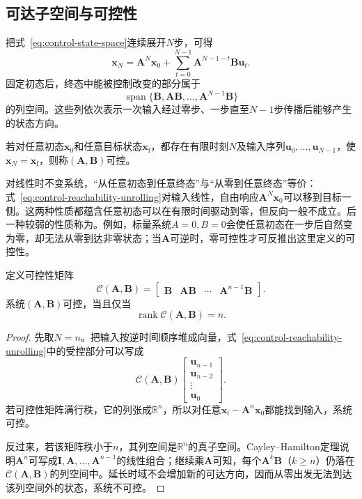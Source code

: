 \subsection{可达子空间与可控性}
把式~\eqref{eq:control-state-space}连续展开$N$步，可得
\begin{equation}
  \bm{x}_N
  =
  \bm{A}^{N}\bm{x}_0
  +
  \sum_{t=0}^{N-1}
  \bm{A}^{N-1-t}\bm{B}\bm{u}_t.
  \label{eq:control-reachability-unrolling}
\end{equation}
固定初态后，终态中能被控制改变的部分属于
\[
  \operatorname{span}
  \{\bm{B},\bm{A}\bm{B},\ldots,
    \bm{A}^{N-1}\bm{B}\}
\]
的列空间。这些列依次表示一次输入经过零步、一步直至$N-1$步传播后能够产生的状态方向。
\begin{definition}[可控性]
\label{def:control-controllability}
若对任意初态$\bm{x}_0$和任意目标状态$\bm{x}_{\mathrm f}$，都存在有限时刻$N$及输入序列$\bm{u}_0,\ldots,\bm{u}_{N-1}$，使$\bm{x}_N=\bm{x}_{\mathrm f}$，则称$(\bm{A},\bm{B})$可控。
\end{definition}
对线性时不变系统，“从任意初态到任意终态”与“从零到任意终态”等价：式~\eqref{eq:control-reachability-unrolling}对输入线性，自由响应$\bm{A}^N\bm{x}_0$可以移到目标一侧。这两种性质都蕴含任意初态可以在有限时间驱动到零，但反向一般不成立。后一种较弱的性质称为。例如，标量系统$A=0,B=0$会使任意初态在一步后自然变为零，却无法从零到达非零状态；当$\bm{A}$可逆时，零可控性才可反推出这里定义的可控性。
\begin{theorem}[Kalman可控性秩判据]
\label{thm:control-controllability-rank}
定义可控性矩阵
\begin{equation}
  \mathcal{C}(\bm{A},\bm{B})
  =
  \begin{bmatrix}
    \bm{B}&\bm{A}\bm{B}&\cdots&\bm{A}^{n-1}\bm{B}
  \end{bmatrix}.
  \label{eq:control-controllability-matrix}
\end{equation}
系统$(\bm{A},\bm{B})$可控，当且仅当
\[
  \operatorname{rank}\mathcal{C}(\bm{A},\bm{B})=n.
\]
\end{theorem}
\begin{proof}
先取$N=n$。把输入按逆时间顺序堆成向量，式~\eqref{eq:control-reachability-unrolling}中的受控部分可以写成
\[
  \mathcal{C}(\bm{A},\bm{B})
  \begin{bmatrix}
    \bm{u}_{n-1}\\
    \bm{u}_{n-2}\\
    \vdots\\
    \bm{u}_0
  \end{bmatrix}.
\]
若可控性矩阵满行秩，它的列张成$\mathbb{R}^n$，所以对任意$\bm{x}_{\mathrm f}-\bm{A}^n\bm{x}_0$都能找到输入，系统可控。

反过来，若该矩阵秩小于$n$，其列空间是$\mathbb{R}^n$的真子空间。Cayley--Hamilton定理说明$\bm{A}^n$可写成$\bm{I},\bm{A},\ldots,\bm{A}^{n-1}$的线性组合；继续乘$\bm{A}$可知，每个$\bm{A}^k\bm{B}$（$k\geq n$）仍落在$\mathcal{C}(\bm{A},\bm{B})$的列空间中。延长时域不会增加新的可达方向，因而从零出发无法到达该列空间外的状态，系统不可控。
\end{proof}
